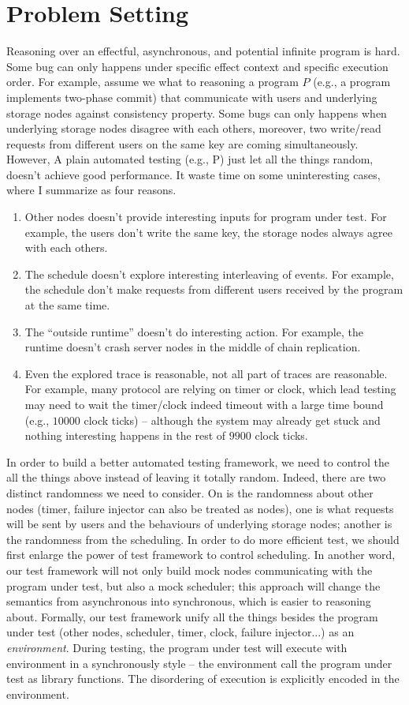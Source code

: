 \section{Problem Setting}

Reasoning over an effectful, asynchronous, and potential infinite program is hard. Some bug can only happens under specific effect context and specific execution order. For example, assume we what to reasoning a program $P$ (e.g., a program implements two-phase commit) that communicate with users and underlying storage nodes against consistency property. Some bugs can only happens when underlying storage nodes disagree with each others, moreover, two write/read requests from different users on the same key are coming simultaneously. However, A plain automated testing (e.g., P) just let all the things random, doesn't achieve good performance. It waste time on some uninteresting cases, where I summarize as four reasons.
\begin{enumerate}
    \item Other nodes doesn't provide interesting inputs for program under test. For example, the users don't write the same key, the storage nodes always agree with each others.
    \item The schedule doesn't explore interesting interleaving of events. For example, the schedule don't make requests from different users received by the program at the same time.
    \item The ``outside runtime'' doesn't do interesting action. For example, the runtime doesn't crash server nodes in the middle of chain replication.
    \item Even the explored trace is reasonable, not all part of traces are reasonable. For example, many protocol are relying on timer or clock, which lead testing may need to wait the timer/clock indeed timeout with a large time bound (e.g., $10000$ clock ticks) -- although the system may already get stuck and nothing interesting happens in the rest of $9900$ clock ticks.
\end{enumerate}

In order to build a better automated testing framework, we need to control the all the things above instead of leaving it totally random. Indeed, there are two distinct randomness we need to consider. On is the randomness about other nodes (timer, failure injector can also be treated as nodes), one is what requests will be sent by users and the behaviours of underlying storage nodes; another is the randomness from the scheduling. In order to do more efficient test, we should first enlarge the power of test framework to control scheduling. In another word, our test framework will not only build mock nodes communicating with the program under test, but also a mock scheduler; this approach will change the semantics from asynchronous into synchronous, which is easier to reasoning about. Formally, our test framework unify all the things besides the program under test (other nodes, scheduler, timer, clock, failure injector...) as an \emph{environment}. During testing, the program under test will execute with environment in a synchronously style -- the environment call the program under test as library functions. The disordering of execution is explicitly encoded in the environment.

